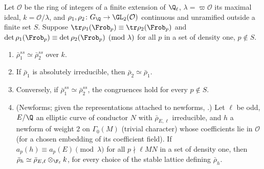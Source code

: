 \begin{corollary}\label{cor:galois:congruent-ap}
Let $\mathcal{O}$ be the ring of integers of a finite extension of $\Q_\ell$, $\lambda=\varpi\mathcal{O}$ its maximal ideal, $k=\mathcal{O}/\lambda$, and
$\rho_1,\rho_2\colon G_\Q\to\GL_2(\mathcal{O})$ continuous and unramified outside a finite set $S$. Suppose $\tr\rho_1(\Frob_p)\equiv\tr\rho_2(\Frob_p)$ and
$\det\rho_1(\Frob_p)\equiv\det\rho_2(\Frob_p)\pmod\lambda$ for all $p$ in a set of density one, $p\notin S$.
\begin{enumerate}[label=(\alph*)]
\item $\bar\rho_1^{ss}\simeq\bar\rho_2^{ss}$ over $k$.
\item If $\bar\rho_1$ is absolutely irreducible, then $\bar\rho_2\simeq\bar\rho_1$.
\item Conversely, if $\bar\rho_1^{ss}\simeq\bar\rho_2^{ss}$, the congruences hold for every $p\notin S$.
\item (Newforms; given the representations attached to newforms, .) Let $\ell$ be odd, $E/\Q$ an elliptic curve of conductor $N$ with
$\bar\rho_{E,\ell}$ irreducible, and $h$ a newform of weight $2$ on $\Gamma_0(M)$ (trivial character) whose coefficients lie in $\mathcal{O}$ (for a chosen embedding of its coefficient field).
If $a_p(h)\equiv a_p(E)\pmod\lambda$ for all $p\nmid\ell MN$ in a set of density one, then $\bar\rho_h\simeq\bar\rho_{E,\ell}\otimes_{\F_\ell}k$, for every choice of the stable
lattice defining $\bar\rho_h$.
\end{enumerate}
\end{corollary}

